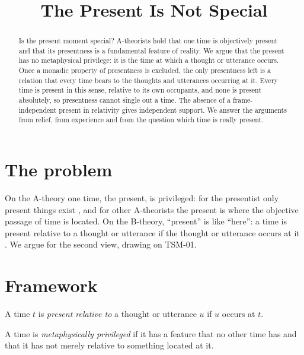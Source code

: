 \documentclass{situationist-preprint}
\title{The Present Is Not Special}
\begin{document}
\maketitle

\begin{abstract}
Is the present moment special? A-theorists hold that one time is objectively present and that its presentness is a fundamental feature of reality. We argue that the present has no metaphysical privilege: it is the time at which a thought or utterance occurs. Once a monadic property of presentness is excluded, the only presentness left is a relation that every time bears to the thoughts and utterances occurring at it. Every time is present in this sense, relative to its own occupants, and none is present absolutely, so presentness cannot single out a time. The absence of a frame-independent present in relativity gives independent support. We answer the arguments from relief, from experience and from the question which time is really present.
\end{abstract}

\section{The problem}

On the A-theory one time, the present, is privileged: for the presentist only present things exist \citep{Markosian2004}, and for other A-theorists the present is where the objective passage of time is located. On the B-theory, \enquote{present} is like \enquote{here}: a time is present relative to a thought or utterance if the thought or utterance occurs at it \citep{Reichenbach1947,Smart1963,Mellor1998}. We argue for the second view, drawing on TSM-01.

\section{Framework}

\begin{definition}[Presentness]\label{d:pres}
A time $t$ is \emph{present relative to} a thought or utterance $u$ if $u$ occurs at $t$.
\end{definition}

\begin{definition}[Privilege]\label{d:priv}
A time is \emph{metaphysically privileged} if it has a feature that no other time has and that it has not merely relative to something located at it.
\end{definition}
\end{document}
